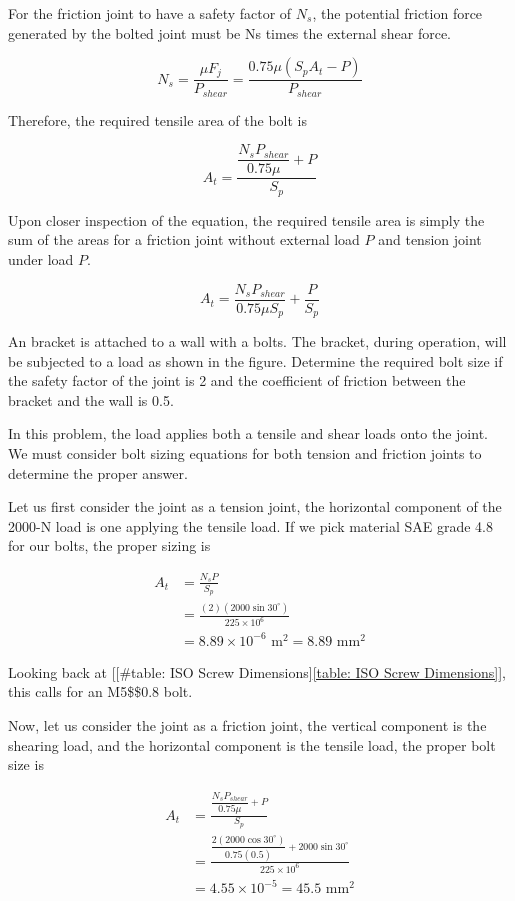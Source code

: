 \documentclass[a4paper,openany,12pt]{book}
\begin{document}
{{For the friction joint to have a safety factor of \(N_s\), the potential
friction force generated by the bolted joint must be Ns times the
external shear force.

$$N_s = \frac{\mu F_j}{P_{shear}} = \frac{0.75\mu (S_pA_t - P)}{P_{shear}}$$

Therefore, the required tensile area of the bolt is

$$A_t = \frac{\dfrac{N_s P_{shear}}{0.75\mu } + P}{S_p}$$

Upon closer inspection of the equation, the required tensile area is
simply the sum of the areas for a friction joint without external load
\(P\) and tension joint under load \(P\).

$$A_t = \frac{N_s P_{shear}}{0.75\mu S_p } + \frac{P}{S_p}$$

An bracket is attached to a wall with a bolts. The bracket, during
operation, will be subjected to a load as shown in the figure. Determine
the required bolt size if the safety factor of the joint is 2 and the
coefficient of friction between the bracket and the wall is 0.5.


In this problem, the load applies both a tensile and shear loads onto
the joint. We must consider bolt sizing equations for both tension and
friction joints to determine the proper answer.

Let us first consider the joint as a tension joint, the horizontal
component of the 2000-N load is one applying the tensile load. If we
pick material SAE grade 4.8 for our bolts, the proper sizing is

$$\begin{aligned}
    A_t &= \frac{N_s P}{S_p} \\
        &= \frac{(2)(2000 \sin 30^{\circ})}{225 \times 10^6} \\
        &= 8.89 \times 10^{-6} \text{ m}^2 = 8.89 \text{ mm}^2
  \end{aligned}$$

Looking back at
[[\#table: ISO Screw Dimensions]\ref{table: ISO Screw Dimensions}], this
calls for an M5\$\texttimes{}\$0.8 bolt.

Now, let us consider the joint as a friction joint, the vertical
component is the shearing load, and the horizontal component is the
tensile load, the proper bolt size is

$$\begin{aligned}
    A_t &= \frac{\dfrac{N_s P_{shear}}{0.75\mu } + P}{S_p} \\
        &= \frac{\dfrac{2(2000 \cos 30^{\circ})}{0.75(0.5)} + 2000 \sin 30^{\circ}}{225 \times 10^6} \\
        &= 4.55 \times 10^{-5} = 45.5 \text{ mm}^2
  \end{aligned}$$

}}
\end{document}
